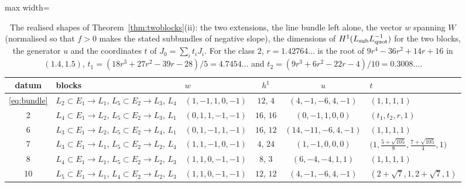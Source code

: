 \begin{table}[t]\small\centering
\caption{The realised shapes of Theorem~\ref{thm:twoblocks}(ii):
the two extensions, the line bundle left alone, the vector $w$ spanning
$W$ (normalised so that $f>0$ makes the stated subbundles of negative
slope), the dimensions of $H^1(L_{\rm sub}L_{\rm quot}^{-1})$ for the two
blocks, the generator $u$ and the coordinates $t$ of $J_0=\sum_it_iJ_i$.
For the class $2$, $r=1.42764\dots$ is the root of
$9r^4-36r^2+14r+16$ in $(1.4,1.5)$, $t_1=(18r^3+27r^2-39r-28)/5=4.7454\dots$
and $t_2=(9r^3+6r^2-22r-4)/10=0.3008\dots$.}\label{tab:twoblocks}
\begin{adjustbox}{max width=\linewidth}
\begin{tabular}{@{}cllccl@{}}
\toprule
datum & blocks & $w$ & $h^1$ & $u$ & $t$\\\midrule
\eqref{eq:bundle} & $L_2\subset E_1\to L_1$, $L_5\subset E_2\to L_3$, $L_4$ & $(1,-1,1,0,-1)$ & $12$, $4$ & $(4,-1,-6,4,-1)$ & $(1,1,1,1)$\\
2 & $L_4\subset E_1\to L_2$, $L_5\subset E_2\to L_3$, $L_1$ & $(0,1,1,-1,-1)$ & $16$, $16$ & $(0,-1,1,0,0)$ & $(t_1,t_2,r,1)$\\
6 & $L_3\subset E_1\to L_2$, $L_5\subset E_2\to L_4$, $L_1$ & $(0,1,-1,1,-1)$ & $16$, $12$ & $(14,-11,-6,4,-1)$ & $(1,1,1,1)$\\
7 & $L_3\subset E_1\to L_1$, $L_5\subset E_2\to L_2$, $L_4$ & $(1,1,-1,0,-1)$ & $4$, $24$ & $(1,-1,0,0,0)$ & $\bigl(1,\tfrac{5+\sqrt{105}}8,\tfrac{7+\sqrt{105}}4,1\bigr)$\\
8 & $L_4\subset E_1\to L_1$, $L_5\subset E_2\to L_2$, $L_3$ & $(1,1,0,-1,-1)$ & $8$, $3$ & $(6,-4,-4,1,1)$ & $(1,1,1,1)$\\
10 & $L_5\subset E_1\to L_1$, $L_4\subset E_2\to L_2$, $L_3$ & $(1,1,0,-1,-1)$ & $12$, $12$ & $(4,-1,-6,4,-1)$ & $(2+\sqrt7,1,2+\sqrt7,1)$\\
\bottomrule
\end{tabular}
\end{adjustbox}
\end{table}

